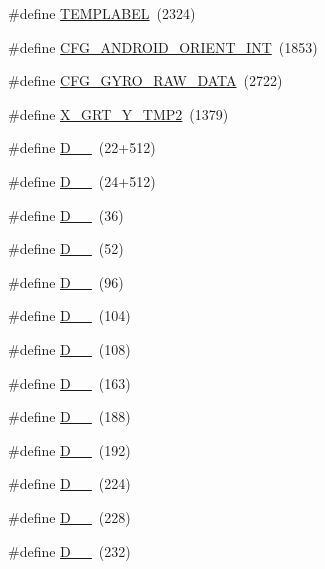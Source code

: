 \begin{DoxyCompactItemize}
\item 
\#define \hyperlink{group___d_r_i_v_e_r_s_gaf08a08d5d5c6944564fe84a46227968d}{T\+E\+M\+P\+L\+A\+B\+EL}~(2324)
\item 
\#define \hyperlink{group___d_r_i_v_e_r_s_gacc91af9a664cf438b93a3faa108bb603}{C\+F\+G\+\_\+\+A\+N\+D\+R\+O\+I\+D\+\_\+\+O\+R\+I\+E\+N\+T\+\_\+\+I\+NT}~(1853)
\item 
\#define \hyperlink{group___d_r_i_v_e_r_s_ga01dcbc69fa28559529653a3b4aabea00}{C\+F\+G\+\_\+\+G\+Y\+R\+O\+\_\+\+R\+A\+W\+\_\+\+D\+A\+TA}~(2722)
\item 
\#define \hyperlink{group___d_r_i_v_e_r_s_ga193d85c2bd5dd9e43c1f89445e999ac6}{X\+\_\+\+G\+R\+T\+\_\+\+Y\+\_\+\+T\+M\+P2}~(1379)
\item 
\#define \hyperlink{group___d_r_i_v_e_r_s_ga155b1481095edac7a26c8c3d5b9c5a24}{D\+\_\+\_}~(22+512)
\item 
\#define \hyperlink{group___d_r_i_v_e_r_s_ga15d46d25c01d6bc9c849c3ba42dcfa54}{D\+\_\+\_}~(24+512)
\item 
\#define \hyperlink{group___d_r_i_v_e_r_s_ga98e58a52ab30dcc007284b185347cf0f}{D\+\_\+\_}~(36)
\item 
\#define \hyperlink{group___d_r_i_v_e_r_s_gaa3d478603bf46f77a6eb95f2c71ee48e}{D\+\_\+\_}~(52)
\item 
\#define \hyperlink{group___d_r_i_v_e_r_s_ga7e992a46da86f1d053f9ef5fc2e53b7a}{D\+\_\+\_}~(96)
\item 
\#define \hyperlink{group___d_r_i_v_e_r_s_ga5edbce4fdd515aa31a227fb8eaf0151f}{D\+\_\+\_}~(104)
\item 
\#define \hyperlink{group___d_r_i_v_e_r_s_gabbbb1d6730f23abc1e951d7741fa24d5}{D\+\_\+\_}~(108)
\item 
\#define \hyperlink{group___d_r_i_v_e_r_s_ga4d6d669548fe77f07062baf9e452fb06}{D\+\_\+\_}~(163)
\item 
\#define \hyperlink{group___d_r_i_v_e_r_s_gabe9d05e6c0b53d1452944c767ec4e39f}{D\+\_\+\_}~(188)
\item 
\#define \hyperlink{group___d_r_i_v_e_r_s_ga737381384143cf039503023e04037a26}{D\+\_\+\_}~(192)
\item 
\#define \hyperlink{group___d_r_i_v_e_r_s_gafd5baf97b37c848b12dec9b718d27188}{D\+\_\+\_}~(224)
\item 
\#define \hyperlink{group___d_r_i_v_e_r_s_ga87090eb84fc9a689a087e9f7e59cd4fb}{D\+\_\+\_}~(228)
\item 
\#define \hyperlink{group___d_r_i_v_e_r_s_gafd752a244bd3eb5e07f77712d9653197}{D\+\_\+\_}~(232)

\end{DoxyCompactItemize}
